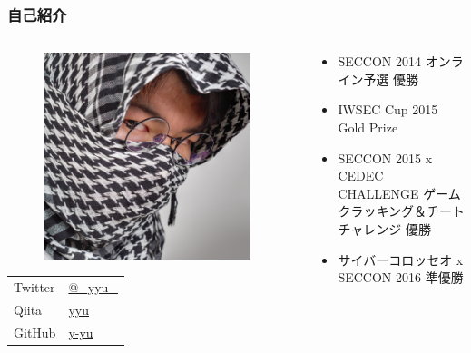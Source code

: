 \begin{frame}
  \frametitle{自己紹介}
  
  \begin{columns}
    \begin{column}{0.4\textwidth}
      \begin{center}
        \begin{figure}
          \includegraphics[width=0.95\textwidth]{img/me.jpg}
        \end{figure}
      \end{center}

      \begin{table}[h]
        \begin{tabular}{ll}
          Twitter & \href{https://twitter.com/\_yyu\_}{@\_yyu\_} \\
          Qiita &  \href{https://qiita.com/yyu}{yyu} \\
          GitHub &  \href{https://github.com/y-yu}{y-yu} \\
        \end{tabular}
      \end{table}
    \end{column}
    \begin{column}{0.6\textwidth}
      \begin{itemize}
        \item SECCON 2014 オンライン予選 優勝
        \item IWSEC Cup 2015 Gold Prize
        \item SECCON 2015 x CEDEC CHALLENGE ゲームクラッキング＆チートチャレンジ 優勝
        \item サイバーコロッセオ x SECCON 2016 準優勝        
      \end{itemize}
    \end{column}
  \end{columns}
\end{frame}

